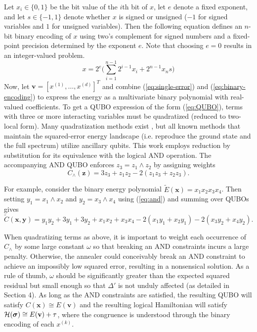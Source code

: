 Let $x_i\in\{0,1\}$ be the bit value of the $i$th bit of $x$, let $e$ denote a fixed exponent, and let $s\in\{-1,1\}$ denote whether $x$ is signed or unsigned ($-1$ for signed variables and $1$ for unsigned variables).
Then the following equation defines an $n$-bit binary encoding of $x$ using two's complement for signed numbers and a fixed-point precision determined by the exponent $e$.
Note that choosing $e=0$ results in an integer-valued problem.
\begin{equation}
x = 2^e \Bigg ( \sum_{i=1}^{n-1} 2^{i-1} x_i + 2^{n-1}x_{n}s \Bigg )
\label{eq:binary-encoding}
\end{equation}
Now, let $\mathbf{v} = [x^{(1)}, \ldots, x^{(d)}]^T$ and combine (\ref{eq:single-error}) and (\ref{eq:binary-encoding}) to express the energy as a multivariate binary polynomial with real-valued coefficients.
To get a QUBO expression of the form (\ref{eq:QUBO}), terms with three or more interacting variables must be quadratized (reduced to two-local form).
Many quadratization methods exist \cite{dattani2019quadratization}, but all known methods that maintain the squared-error energy landscape (i.e. reproduce the ground state and the full spectrum) utilize ancillary qubits.
This work employs reduction by substitution \cite{rosenberg1975reduction} for its equivalence with the logical AND operation.
The accompanying AND QUBO enforces $z_3 = z_1 \wedge z_2$ by assigning weights
\begin{equation}
C_{\wedge}(\mathbf{z}) = 3z_3 + z_1 z_2 - 2 (z_1 z_3 + z_2 z_3).
\label{eq:and}
\end{equation}

For example, consider the binary energy polynomial ${\tilde E}(\mathbf{x}) = x_1x_2x_3x_4$. Then setting $y_1 = x_1 \wedge x_2$ and $y_2 = x_3 \wedge x_4$ using (\ref{eq:and}) and summing over QUBOs gives 
$$
{\tilde C}(\mathbf{x},\mathbf{y}) = y_1y_2 + 3y_1 + 3y_2 + x_1x_2 + x_3x_4 - 2(x_1y_1 + x_2y_1) - 2(x_3y_2 + x_4y_2).
$$

When quadratizing terms as above, it is important to weight each occurrence of $C_\wedge$ by some large constant $\omega$ so that breaking an AND constraints incurs a large penalty.
Otherwise, the annealer could conceivably break an AND constraint to achieve an impossibly low squared error, resulting in a nonsensical solution.
As a rule of thumb, $\omega$ should be significantly greater than the expected squared residual but small enough so that $\Delta'$ is not unduly affected (as detailed in Section 4).
As long as the AND constraints are satisfied, the resulting QUBO will satisfy $C(\mathbf{x}) \cong E(\mathbf{v})$ and the resulting logical Hamiltonian will satisfy $\mathcal{H}(\text{\boldmath$\sigma$}) \cong E(\mathbf{v}) + \tau$, where the congruence is understood through the binary encoding of each $x^{(k)}$.
